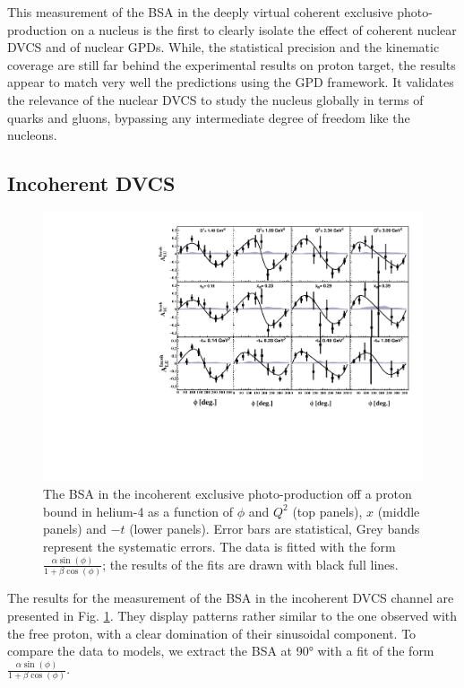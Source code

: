 \documentclass[aps,prc,preprint,superscriptaddress]{revtex4}
\begin{document}
This measurement of the BSA in the deeply virtual coherent exclusive photo-production on a nucleus
is the first to clearly isolate the effect of coherent nuclear DVCS and of nuclear GPDs. While, the
statistical precision and the kinematic coverage are still far behind the experimental results on
proton target, the results appear to match very well the predictions using the GPD framework. It 
validates the relevance of the nuclear DVCS to study the nucleus globally in terms of quarks and 
gluons, bypassing any intermediate degree of freedom like the nucleons. 

\subsection{Incoherent DVCS}

\begin{figure}[bp!]
\center
\includegraphics[width=15cm]{fig3/incoherent_ALU_phi.pdf}
	\caption{The BSA in the incoherent exclusive photo-production off a proton bound in
	helium-4 as a function of $\phi$ and $Q^2$ 
	(top panels), $x$ (middle panels) and $-t$ (lower panels). Error bars are  
	statistical, Grey bands represent the systematic errors. The data is fitted with the 
	form $\frac{\alpha \sin(\phi)}{1+\beta \cos(\phi)}$; the results of the 
	fits are drawn with black full lines.}
\label{fig:InCohALUphi}
\end{figure}

The results for the measurement of the BSA in the incoherent DVCS channel are presented in
Fig. \ref{fig:InCohALUphi}. They display patterns rather similar to the one observed with the 
free proton, with a clear domination of their sinusoidal component. To compare the data to 
models, we extract the BSA at 90° with a fit of the form $\frac{\alpha \sin(\phi)}{1+\beta \cos(\phi)}$. 
\end{document}
